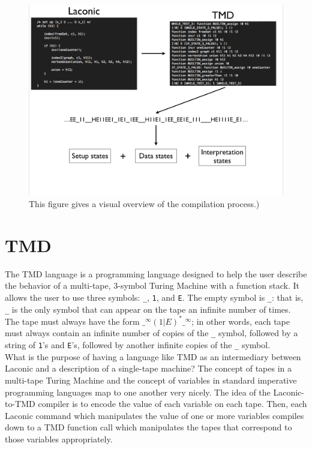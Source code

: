 \documentclass[11pt]{article}
\begin{document}
\begin{figure} 
\begin{center} 
\includegraphics[scale=0.6]{figs/compilation.png}
\caption{This figure gives a visual overview of the compilation process.) \label{fig:compilation}} 
\end{center} 
\end{figure}

\section{TMD}

The TMD language is a programming language designed to help the user describe the behavior of a multi-tape, 3-symbol Turing Machine with a function stack. It allows the user to use three symbols: \texttt{\_}, \texttt{1}, and \texttt{E}. The empty symbol is \texttt{\_}: that is, \texttt{\_} is the only symbol that can appear on the tape an infinite number of times. The tape must always have the form $\texttt{\_}^{\infty}(1|E)^*\texttt{\_}^{\infty}$; in other words, each tape must always contain an infinite number of copies of the \texttt{\_} symbol, followed by a string of \texttt{1}'s and \texttt{E}'s, followed by another infinite copies of the \texttt{\_} symbol. \\

What is the purpose of having a language like TMD as an intermediary between Laconic and a description of a single-tape machine? The concept of tapes in a multi-tape Turing Machine and the concept of variables in standard imperative programming languages map to one another very nicely. The idea of the Laconic-to-TMD compiler is to encode the value of each variable on each tape. Then, each Laconic command which manipulates the value of one or more variables compiles down to a TMD function call which manipulates the tapes that correspond to those variables appropriately. \\
\end{document}
